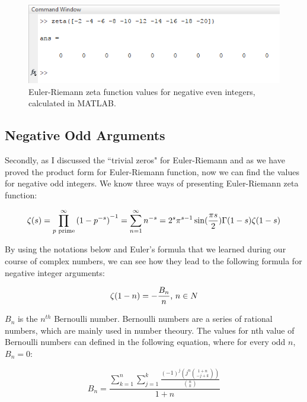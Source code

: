 \documentclass{beamer}
\begin{document}
\begin{figure}[h!]
  \includegraphics[width=\textwidth]{zerosv.png}
\begin{center}
  \caption{Euler-Riemann zeta
function values for
negative even integers,
calculated in MATLAB.}
  \label{fig:zerosv}
\end{center}
\end{figure}

\subsection{Negative Odd Arguments}

Secondly, as I discussed the “trivial zeros" for Euler-Riemann and as we have proved the product
form for Euler-Riemann function, now we can find the values for negative odd integers. We know
three ways of presenting Euler-Riemann zeta function:

\begin{equation}
  \zeta(s)=\prod_{p \text{ prime}}^{\infty} {(1-p^{-s})}^{-1}=\sum_{n=1}^{\infty} n^{-s}=2^s\pi^{s-1}\sin(\frac{\pi s}{2})\Gamma(1-s)\zeta(1-s)\\
  \end{equation}

By using the notations below and Euler's formula that we learned during our course of complex
numbers, we can see how they lead\cite{Bern} to the following formula
for negative integer arguments:

\begin{equation}
  \label{bnn}
  \zeta(1-n)=-\frac{B_n}{n} \text{, $n\in N$}\\
  \end{equation}

$B_n$ is the $n^{th}$ Bernoulli number. Bernoulli numbers are a series of rational numbers, which are
mainly used in number theoury. The values for nth value of Bernoulli numbers can defined in the
following equation\cite{BernSeq}, where for
every odd $n$, $B_n=0$:

\begin{equation*}
  B_n=\frac{\sum_{k=1}^{n} \sum_{j=1}^{k} \frac{(-1)^j (j^n \binom{1+n}{-j+k}) }{\binom{n}{k}} }{1+n}
  \end{equation*}
\end{document}
